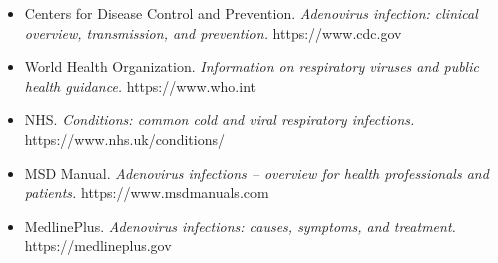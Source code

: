 \begin{itemize}
    \item Centers for Disease Control and Prevention. \textit{Adenovirus infection: clinical overview, transmission, and prevention.} https://www.cdc.gov
    \item World Health Organization. \textit{Information on respiratory viruses and public health guidance.} https://www.who.int
    \item NHS. \textit{Conditions: common cold and viral respiratory infections.} https://www.nhs.uk/conditions/
    \item MSD Manual. \textit{Adenovirus infections -- overview for health professionals and patients.} https://www.msdmanuals.com
    \item MedlinePlus. \textit{Adenovirus infections: causes, symptoms, and treatment.} https://medlineplus.gov
\end{itemize}
